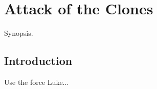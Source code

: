 
\chapter{Attack of the Clones}
	\label{chapter:attack-of-the-clones}%



\begin{synopsis}
	Synopsis.
\end{synopsis}


\section{Introduction}

Use the force Luke...

